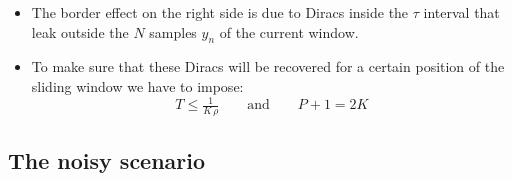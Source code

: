 \documentclass[8pt]{beamer}
\begin{document}
\begin{frame}

\begin{itemize}

\item The border effect on the right side is due to Diracs inside the $\tau$ interval
that leak outside the $N$ samples $y_n$ of the current window.
\\[.2cm]

\item<2-> To make sure that these Diracs will be recovered for a certain position of 
the sliding window we have to impose:
\begin{equation*}
\boxed{T \leq \tfrac{1}{K\,\rho}} \qquad \text{and} \qquad \boxed{P+1 = 2K}
\end{equation*}

\end{itemize}


\end{frame}


\subsection{The noisy scenario}
\end{document}

